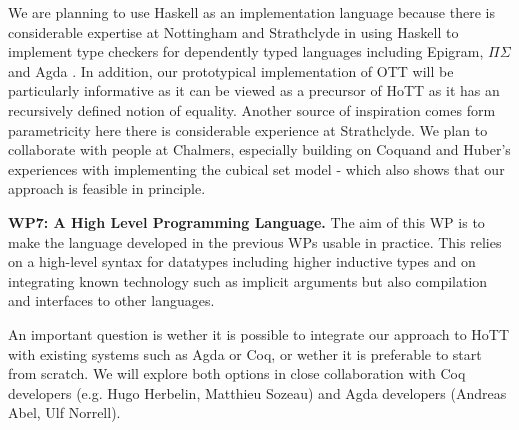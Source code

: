 \documentclass[a4paper,11pt]{article}
\begin{document}
We are planning to use Haskell as an implementation language because
there is considerable expertise at Nottingham and Strathclyde in using
Haskell to implement type checkers for dependently typed languages
including Epigram, $\Pi\Sigma$ and Agda
\cite{alti:checking,easy,alti:pisigma-new}.  In addition, our
prototypical implementation of OTT will be particularly informative as
it can be viewed as a precursor of HoTT as it has an recursively
defined notion of equality. Another source of inspiration comes form parametricity 
here there is considerable experience at Strathclyde.
We plan to collaborate with people at
Chalmers, especially building on Coquand and Huber's experiences with
implementing the cubical set model - which also shows that our
approach is feasible in principle.



{\bf WP7: A High Level Programming Language.} The aim of this WP is to
make the language developed in the previous WPs usable in
practice. This relies on a high-level syntax for datatypes including
higher inductive types and on integrating known technology such as
implicit arguments but also compilation and interfaces to other
languages.

An important question is wether it is possible to integrate our
approach to HoTT with existing systems such as Agda or Coq, or wether
it is preferable to start from scratch. We will explore both options
in close collaboration with Coq developers (e.g. Hugo Herbelin,
Matthieu Sozeau) and Agda developers (Andreas Abel, Ulf Norrell).

\end{document}
